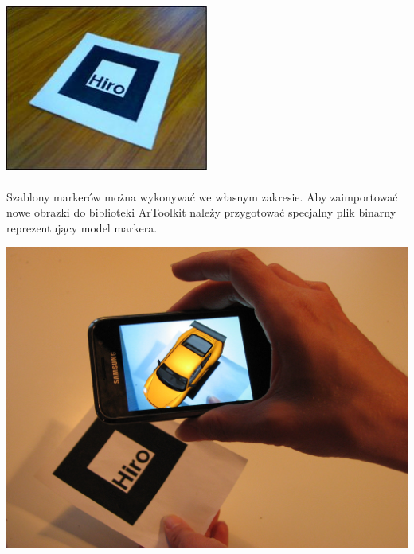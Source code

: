 \begin{center}
\includegraphics[width=0.5\textwidth]{images/hiro.png}

\end{center}
\paragraph{}
Szablony markerów można wykonywać we własnym zakresie. Aby zaimportować nowe obrazki do biblioteki ArToolkit należy przygotować specjalny plik binarny reprezentujący model markera\cite{marker}.

\begin{center}
\includegraphics[width=1\textwidth]{images/artoolkit-demo.jpg}
\end{center}
